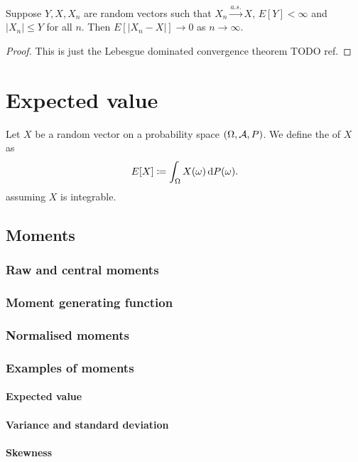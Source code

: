 \begin{lemma}
Suppose $Y,X,X_n$ are random vectors such that $X_n \overset{a.s.}{\longrightarrow} X$, $E[Y]<\infty$ and $|X_n| \leq Y$ for all $n$. Then $E[|X_n -X|] \to 0$ as $n\to \infty$.
\end{lemma}
\begin{proof}
This is just the Lebesgue dominated convergence theorem TODO ref.
\end{proof}

\section{Expected value}
\begin{definition}
Let $X$ be a random  vector on a probability space $\left( \Omega, \mathcal{A}, P \right)$. We define the  of $X$ as
\[ E[X] \coloneqq \int_\Omega X(\omega)\operatorname{d \!}{P(\omega)}. \]
assuming $X$ is integrable.
\end{definition}



\subsection{Moments}
\subsubsection{Raw and central moments}
\subsubsection{Moment generating function}
\subsubsection{Normalised moments}
\subsubsection{Examples of moments}
\paragraph{Expected value}
\paragraph{Variance and standard deviation}
\paragraph{Skewness}
